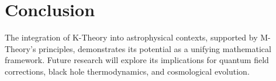 \documentclass{article}
\theoremstyle{plain}
\begin{document}
\section{Conclusion}
The integration of K-Theory into astrophysical contexts, supported by M-Theory's principles, demonstrates its potential as a unifying mathematical framework. Future research will explore its implications for quantum field corrections, black hole thermodynamics, and cosmological evolution.



\end{document}
